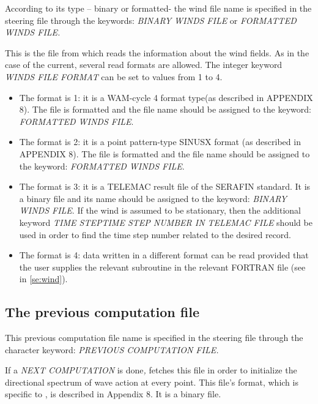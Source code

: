  According to its type -- binary or formatted- the wind file name is specified in the steering file through the keywords: \textit{BINARY WINDS FILE }or\textit{ FORMATTED WINDS FILE.}

 This is the file from which \tomawac reads the information about the wind fields. As in the case of the current, several read formats are allowed. The integer keyword \textit{WINDS FILE FORMAT} can be set to values from 1 to 4.

\begin{itemize}
\item  The format is 1: it is a WAM-cycle 4 format type(as described in APPENDIX 8). The file is formatted and the file name should be assigned to the keyword: \textit{FORMATTED WINDS FILE}.

\item  The format is 2: it is a point pattern-type SINUSX format (as described in APPENDIX 8). The file is formatted and the file name should be assigned to the keyword: \textit{FORMATTED WINDS FILE}.

\item  The format is 3: it is a TELEMAC result file of the SERAFIN standard. It is a binary file and its name should be assigned to the keyword: \textit{BINARY WINDS FILE}. If the wind is assumed to be stationary, then the additional keyword \textit{TIME STEPTIME STEP NUMBER IN TELEMAC FILE }should be used in order to find the time step number related to the desired record.

\item  The format is 4: data written in a different format can be read provided that the user supplies the relevant subroutine in the relevant FORTRAN file (see in \ref{se:wind}).
\end{itemize}


\subsection{ The previous computation file}

 This previous computation file name is specified in the steering file through the character keyword: \textit{PREVIOUS COMPUTATION FILE.}

 If a \textit{NEXT COMPUTATION} is done\textit{, }\tomawac fetches this file in order to initialize the directional spectrum of wave action at every point. This file's format, which is specific to \tomawac, is described in Appendix 8. It is a binary file.


